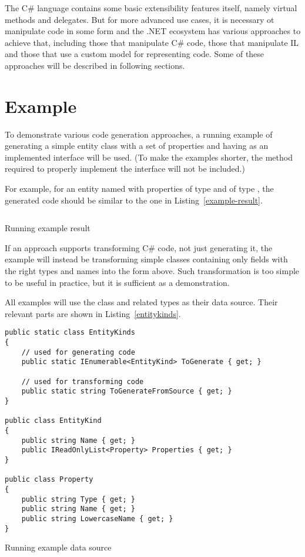 \medskip

The C\# language contains some basic extensibility features itself, namely virtual methods and delegates.
But for more advanced use cases, it is necessary ot manipulate code in some form and the .NET ecosystem has various approaches to achieve that, including those that manipulate C\# code, those that manipulate \ac{IL} and those that use a custom model for representing code. Some of these approaches will be described in following sections.

\section{Example}

To demonstrate various code generation approaches, a running example of generating a simple entity class with a set of properties and having  as an implemented interface will be used. (To make the examples shorter, the  method required to properly implement the interface will not be included.)

For example, for an entity named  with properties  of type  and  of type , the generated code should be similar to the one in Listing~\ref{example-result}.

\begin{listing}
\inputminted{csharp}{samples/Core/Person.cs}
\caption{Running example result}
\label{example-result}
\end{listing}

If an approach supports transforming C\# code, not just generating it, the example will instead be transforming simple classes containing only fields with the right types and names into the form above. Such transformation is too simple to be useful in practice, but it is sufficient as a demonstration.

All examples will use the  class and related types as their data source. Their relevant parts are shown in Listing~\ref{entitykinds}.

\begin{listing}
\begin{verbatim}
public static class EntityKinds
{
    // used for generating code
    public static IEnumerable<EntityKind> ToGenerate { get; }
    
    // used for transforming code
    public static string ToGenerateFromSource { get; }
}

public class EntityKind
{
    public string Name { get; }
    public IReadOnlyList<Property> Properties { get; }
}

public class Property
{
    public string Type { get; }
    public string Name { get; }
    public string LowercaseName { get; }
}
\end{verbatim}
\caption{Running example data source}
\label{entitykinds}
\end{listing}

